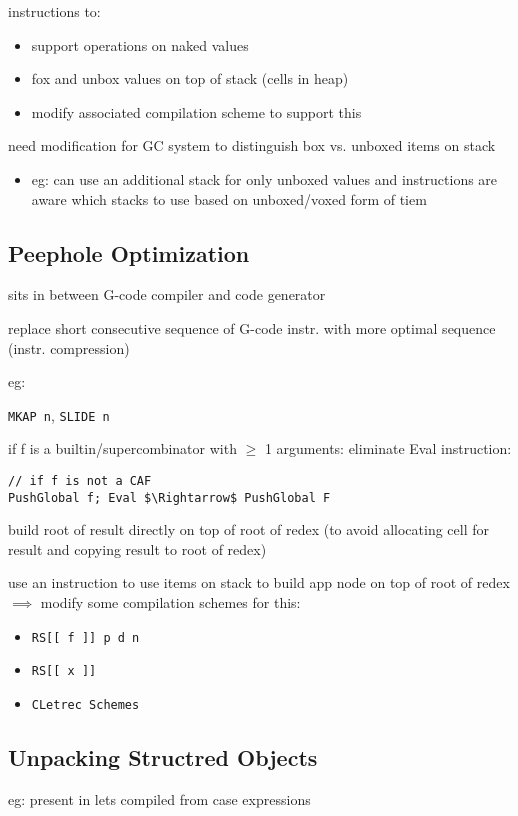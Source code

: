 \documentclass[8pt]{extarticle}
\begin{document}
\begin{multicols*}{2}
instructions to:
\begin{itemize}
\item support operations on naked values
\item fox and unbox values on top of stack (cells in heap)
\item modify associated compilation scheme to support this
\end{itemize}

need modification for GC system to distinguish box vs. unboxed items on stack
\begin{itemize}
\item eg: can use an additional stack for only unboxed values and instructions are aware which stacks to use based on unboxed/voxed form of tiem
\end{itemize}

\subsection{Peephole Optimization}

sits in between G-code compiler and code generator

replace short consecutive sequence of G-code instr. with more optimal sequence (instr. compression)

eg:

\verb|MKAP n|, \verb|SLIDE n|

if f is a builtin/supercombinator with $\geq$ 1 arguments: eliminate Eval instruction:
\begin{lstlisting}
// if f is not a CAF
PushGlobal f; Eval $\Rightarrow$ PushGlobal F 
\end{lstlisting}

build root of result directly on top of root of redex (to avoid allocating cell for result and copying result to root of redex)

use an instruction to use items on stack to build app node on top of root of redex
$\implies$ modify some compilation schemes for this:
\begin{itemize}
\item \verb|RS[[ f ]] p d n|
\item \verb|RS[[ x ]]|
\item \verb|CLetrec Schemes|
\end{itemize}

\subsection{Unpacking Structred Objects}
eg: present in lets compiled from case expressions


\end{multicols*}
\end{document}
